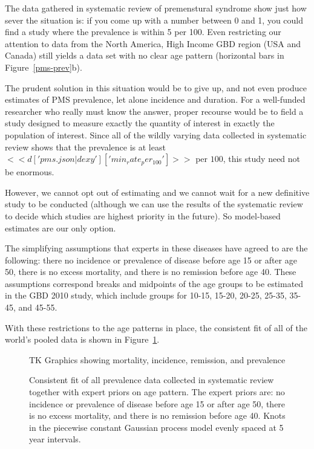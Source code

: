 The data gathered in systematic review of premenstural syndrome show
just how sever the situation is: if you come up with a number
between 0 and 1, you could find a study where the prevalence is within 5
per 100.  Even restricting our attention to data from the North
America, High Income GBD region (USA and Canada) still yields a data set
with no clear age pattern (horizontal bars in Figure~\ref{pms-prev}b).

The prudent solution in this situation would be to give up, and not
even produce estimates of PMS prevalence, let alone incidence and
duration.  For a well-funded researcher who really must know the
answer, proper recourse would be to field a study designed to measure
exactly the quantity of interest in exactly the population of
interest.  Since all of the wildly varying data collected in
systematic review shows that the prevalence is at least
$<<d['pms.json|dexy']['min_rate_per_100']>>$ per $100$, this study
need not be enormous.

However, we cannot opt out of estimating and we cannot wait for a new
definitive study to be conducted (although we can use the results of
the systematic review to decide which studies are highest priority in
the future).  So model-based estimates are our only option.

The simplifying assumptions that experts in these diseases have agreed
to are the following: there no incidence or prevalence of disease
before age 15 or after age 50, there is no excess mortality, and there
is no remission before age 40.  These assumptions correspond breaks
and midpoints of the age groups to be estimated in the GBD 2010 study,
which include groups for 10-15, 15-20, 20-25, 25-35, 35-45, and 45-55.

With these restrictions to the age patterns in place, the consistent
fit of all of the world's pooled data is shown in Figure~\ref{pms-consistent}.
\begin{figure}
\begin{center}
TK Graphics showing mortality, incidence, remission, and prevalence
\end{center}
\caption{Consistent fit of all prevalence data collected in systematic
  review together with expert priors on age pattern.  The expert
  priors are: no incidence or prevalence of disease before age 15 or
  after age 50, there is no excess mortality, and there is no
  remission before age 40.  Knots in the piecewise constant Gaussian
  process model evenly spaced at 5 year intervals.}
\label{pms-consistent}
\end{figure}

